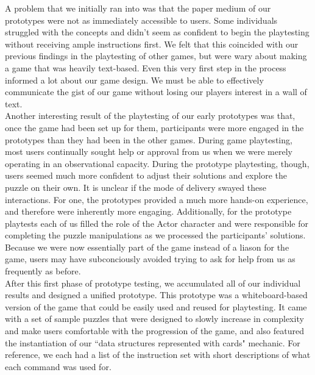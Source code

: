 A problem that we initially ran into was that the paper medium of our prototypes were not 
as immediately accessible to users. Some individuals struggled with the concepts and didn't 
seem as confident to begin the playtesting without receiving ample instructions first. We felt 
that this coincided with our previous findings in the playtesting of other games, but were 
wary about making a game that was heavily text-based. Even this very first step in the process 
informed a lot about our game design. We must be able to effectively communicate the gist of 
our game without losing our players interest in a wall of text.\\

Another interesting result of the playtesting of our early prototypes was that, once the game 
had been set up for them, participants were more engaged in the prototypes than they had 
been in the other games. During game playtesting, most users continually sought help or approval 
from us when we were merely operating in an observational capacity. During the prototype 
playtesting, though, users seemed much more confident to adjust their solutions and explore 
the puzzle on their own. It is unclear if the mode of delivery swayed these interactions. For 
one, the prototypes provided a much more hands-on experience, and therefore were inherently 
more engaging. Additionally, for the prototype playtests each of us filled the role of the Actor 
character and were responsible for completing the puzzle manipulations as we processed the 
participants' solutions. Because we were now essentially part of the game instead of a liason 
for the game, users may have subconciously avoided trying to ask for help from us as frequently 
as before.\\

After this first phase of prototype testing, we accumulated all of our individual results and 
designed a unified prototype. This prototype was a whiteboard-based version of the game 
that could be easily used and reused for playtesting. It came with a set of sample puzzles that 
were designed to slowly increase in complexity and make users comfortable with the progression 
of the game, and also featured the instantiation of our ``data structures represented with cards" 
mechanic. For reference, we each had a list of the instruction set with short descriptions of what 
each command was used for.\\

